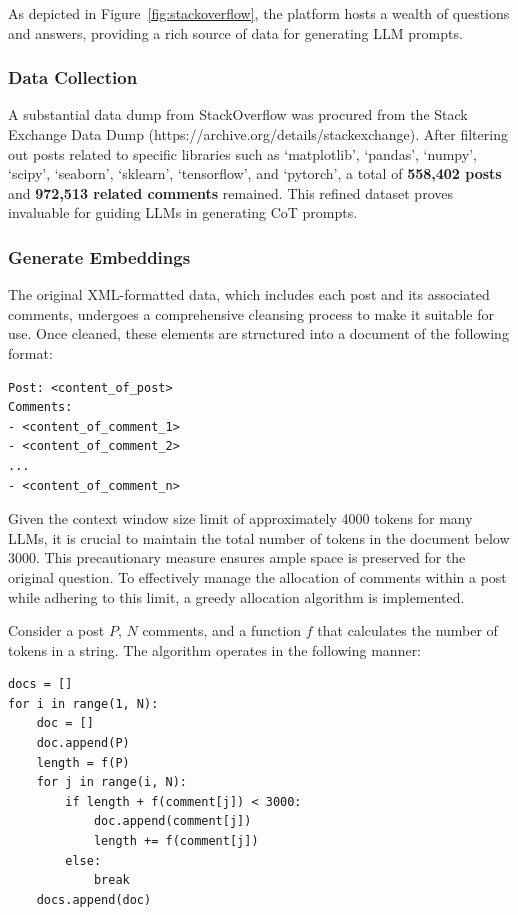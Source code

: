\documentclass[a4paper,oneside]{book}
\begin{document}
As depicted in Figure~\ref{fig:stackoverflow}, the platform hosts a wealth of questions and answers, providing a rich source of data for generating LLM prompts.

\subsubsection{Data Collection}
A substantial data dump from StackOverflow was procured from the Stack Exchange Data Dump (https://archive.org/details/stackexchange). After filtering out posts related to specific libraries such as `matplotlib', `pandas', `numpy', `scipy', `seaborn', `sklearn', `tensorflow', and `pytorch', a total of \textbf{558,402 posts} and \textbf{972,513 related comments} remained. This refined dataset proves invaluable for guiding LLMs in generating CoT prompts.

\subsubsection{Generate Embeddings}
The original XML-formatted data, which includes each post and its associated comments, undergoes a comprehensive cleansing process to make it suitable for use. Once cleaned, these elements are structured into a document of the following format:

\begin{lstlisting}
Post: <content_of_post>
Comments:
- <content_of_comment_1>
- <content_of_comment_2>
...
- <content_of_comment_n>
\end{lstlisting}

Given the context window size limit of approximately 4000 tokens for many LLMs, it is crucial to maintain the total number of tokens in the document below 3000. This precautionary measure ensures ample space is preserved for the original question. To effectively manage the allocation of comments within a post while adhering to this limit, a greedy allocation algorithm is implemented.

Consider a post $P$, $N$ comments, and a function $f$ that calculates the number of tokens in a string. The algorithm operates in the following manner:

\begin{lstlisting}
docs = []
for i in range(1, N):
    doc = []
    doc.append(P)
    length = f(P)
    for j in range(i, N):
        if length + f(comment[j]) < 3000:
            doc.append(comment[j])
            length += f(comment[j])
        else:
            break
    docs.append(doc)
\end{lstlisting}
\end{document}
